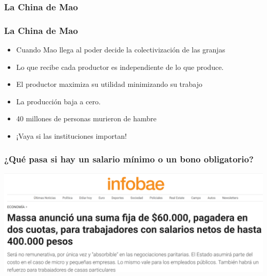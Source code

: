 \documentclass{beamer}
\begin{document}
\begin{frame}
\frametitle{La China de Mao}
\begin{center}
\begin{figure}[H]
\renewcommand{\figurename}{Figure}
\begin{center}
\end{center}
\label{fig:C11.15}
\end{figure}
\end{center}
\end{frame}

\begin{frame}
\frametitle{La China de Mao }
\begin{itemize}
    \item Cuando Mao llega al poder decide la colectivización de las granjas
    \item Lo que recibe cada productor es independiente de lo que produce. 
    
    \item El productor maximiza su utilidad minimizando su trabajo 
     \item La producción baja a cero.  
     \item 40 millones de personas murieron de hambre
     \item ¡Vaya si las instituciones importan! 
\end{itemize}

\end{frame}

\begin{frame}
\frametitle{¿Qué pasa si hay un salario mínimo o un bono obligatorio?}
\centering
\includegraphics[scale=0.33]{../Figures/InstitucionesBono.png}
\end{frame}
\end{document}

